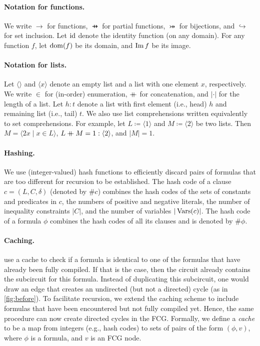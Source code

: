 \paragraph*{Notation for functions.}
We write $\to$ for functions, $\pfun$ for partial functions,
$\twoheadrightarrowtail$ for bijections, and $\hookrightarrow$ for set
inclusion. Let $\operatorname{id}$ denote the identity function (on any domain). For any
function $f$, let $\operatorname{dom}(f)$ be its domain, and $\operatorname{Im} f$ be its image.

\paragraph*{Notation for lists.}
Let $\langle\rangle$ and $\langle x \rangle$ denote an empty list and a list
with one element $x$, respectively. We write $\in$ for (in-order) enumeration,
$\mathbin{+\mkern-10mu+}$ for concatenation, and $|\cdot|$ for the length of a list. Let
$h : t$ denote a list with first element (i.e., head) $h$ and remaining list
(i.e., tail) $t$. We also use list comprehensions written equivalently to set
comprehensions. For example, let $L \coloneqq \langle 1 \rangle$ and
$M \coloneqq \langle 2 \rangle$ be two lists. Then
$M = \langle 2x \mid x \in L \rangle$,
$L \mathbin{+\mkern-10mu+} M = 1 : \langle 2 \rangle$, and $|M| = 1$.

\paragraph*{Hashing.}
We use (integer-valued) hash functions to efficiently discard pairs of formulas
that are too different for recursion to be established. The hash code of a
clause $c = (L, C, \delta)$ (denoted by $\# c$) combines the hash codes of the
sets of constants and predicates in $c$, the numbers of positive and negative
literals, the number of inequality constraints $|C|$, and the number of
variables $|\operatorname{Vars}(c)|$. The hash code of a formula $\phi$ combines the hash
codes of all its clauses and is denoted by $\#\phi$.

\paragraph*{Caching.}
\citet{DBLP:conf/ijcai/BroeckTMDR11} use a cache to check if a formula is
identical to one of the formulas that have already been fully compiled. If that
is the case, then the circuit already contains the subcircuit for this formula.
Instead of duplicating this subcircuit, one would draw an edge that creates an
undirected (but not a directed) cycle (as in \cref{fig:before}). To facilitate
recursion, we extend the caching scheme to include formulas that have been
encountered but not fully compiled yet. Hence, the same procedure can now create
directed cycles in the FCG\@. Formally, we define a \emph{cache} to be a map
from integers (e.g., hash codes) to sets of pairs of the form $(\phi, v)$, where
$\phi$ is a formula, and $v$ is an FCG node.

